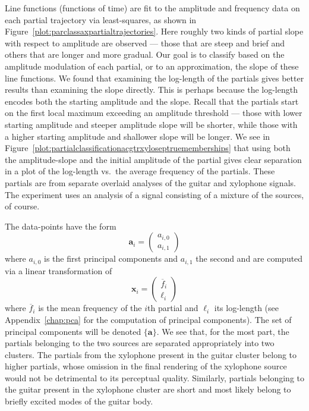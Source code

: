 Line functions (functions of time) are fit to the amplitude and frequency data
on each partial trajectory via least-squares, as shown in
Figure~\ref{plot:parclassaxpartialtrajectories}. Here roughly two kinds of
partial slope with respect to amplitude are observed --- those that are steep and brief and
others that are longer and more gradual. Our goal is to classify based
on the amplitude modulation of each partial, or to an approximation, the slope
of these line functions. We found that examining the log-length of the partials
gives better results than examining the slope directly. This is perhaps
because the log-length encodes both the starting amplitude and the slope. Recall
that the partials start on the first local maximum exceeding an amplitude
threshold --- those with lower starting amplitude and steeper amplitude slope will be
shorter, while those with a higher starting amplitude and shallower slope will
be longer. We see in
Figure~\ref{plot:partialclassificationacgtrxyloseptruememberships} that using
both the amplitude-slope and the initial amplitude of the partial gives clear
separation in a plot of the log-length vs.\ the
average frequency of
the partials. These partials are from separate overlaid analyses of the guitar
and xylophone signals. The experiment uses an analysis of a signal consisting of
a mixture of the sources, of course.

The data-points have the form
\[
    \boldsymbol{a}_i = \begin{pmatrix}
        a_{i,0} \\
        a_{i,1}
    \end{pmatrix}
\]
where $a_{i,0}$ is the first principal components and $a_{i,1}$ the second and are computed via a
linear transformation of
\[
    \boldsymbol{x}_i
    =
    \begin{pmatrix}
        \overline{f}_{i} \\
        \ell_{i}
    \end{pmatrix}
\]
where $\overline{f}_{i}$ is the mean frequency of the $i$th partial and
$\ell_{i}$ its log-length (see
Appendix~\ref{chap:pca} for the computation of principal components). The set of
principal components will be denoted $\{\boldsymbol{a}\}$.
We see that, for the most part, the partials belonging to the two sources are
separated appropriately into two clusters. The partials from the xylophone
present in the guitar cluster belong to higher partials, whose omission in the
final rendering of the xylophone source would not be detrimental to its
perceptual quality. Similarly, partials belonging to the guitar present in the
xylophone cluster are short and most likely belong to briefly excited modes
of the guitar body.

